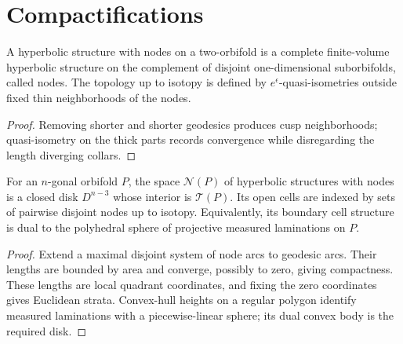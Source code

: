 \section{Compactifications}

\begin{definition}
\label{thurston-ch13-hyperbolic-nodes}

A hyperbolic structure with nodes on a two-orbifold is a complete finite-volume
hyperbolic structure on the complement of disjoint one-dimensional
suborbifolds, called nodes.  The topology up to isotopy is defined by
$e^\epsilon$-quasi-isometries outside fixed thin neighborhoods of the nodes.
\end{definition}
\begin{proof}
\sketch Removing shorter and shorter geodesics produces cusp neighborhoods;
quasi-isometry on the thick parts records convergence while disregarding the
length diverging collars.
\end{proof}

\begin{theorem}
\label{thurston-ch13-polygonal-compactification}

For an $n$-gonal orbifold $P$, the space $\mathcal N(P)$ of hyperbolic
structures with nodes is a closed disk $D^{n-3}$ whose interior is
$\mathcal T(P)$.  Its open cells are indexed by sets of pairwise disjoint nodes
up to isotopy.  Equivalently, its boundary cell structure is dual to the
polyhedral sphere of projective measured laminations on $P$.
\end{theorem}
\begin{proof}
\sketch Extend a maximal disjoint system of node arcs to geodesic arcs.  Their
lengths are bounded by area and converge, possibly to zero, giving compactness.
These lengths are local quadrant coordinates, and fixing the zero coordinates
gives Euclidean strata.  Convex-hull heights on a regular polygon identify
measured laminations with a piecewise-linear sphere; its dual convex body is
the required disk.
\end{proof}

